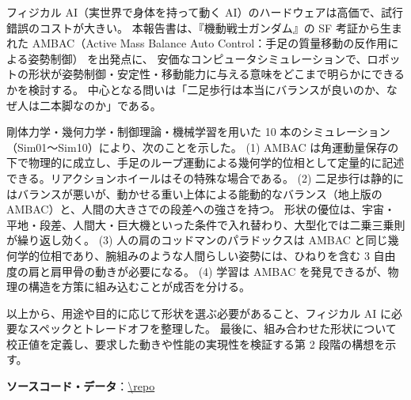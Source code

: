 フィジカル AI（実世界で身体を持って動く AI）のハードウェアは高価で、試行錯誤のコストが大きい。
本報告書は、『機動戦士ガンダム』の SF 考証から生まれた AMBAC（Active Mass Balance Auto Control：手足の質量移動の反作用による姿勢制御）\cite{R1,R42} を出発点に、
安価なコンピュータシミュレーションで、ロボットの形状が姿勢制御・安定性・移動能力に与える意味をどこまで明らかにできるかを検討する。
中心となる問いは「二足歩行は本当にバランスが良いのか、なぜ人は二本脚なのか」である。

剛体力学・幾何力学・制御理論・機械学習を用いた 10 本のシミュレーション（Sim01〜Sim10）により、次のことを示した。
(1) AMBAC は角運動量保存の下で物理的に成立し、手足のループ運動による幾何学的位相として定量的に記述できる。リアクションホイールはその特殊な場合である。
(2) 二足歩行は静的にはバランスが悪いが、動かせる重い上体による能動的なバランス（地上版の AMBAC）と、人間の大きさでの段差への強さを持つ。
形状の優位は、宇宙・平地・段差、人間大・巨大機といった条件で入れ替わり、大型化では二乗三乗則が繰り返し効く。
(3) 人の肩のコッドマンのパラドックスは AMBAC と同じ幾何学的位相であり、腕組みのような人間らしい姿勢には、ひねりを含む 3 自由度の肩と肩甲骨の動きが必要になる。
(4) 学習は AMBAC を発見できるが、物理の構造を方策に組み込むことが成否を分ける。

以上から、用途や目的に応じて形状を選ぶ必要があること、フィジカル AI に必要なスペックとトレードオフを整理した。
最後に、組み合わせた形状について校正値を定義し、要求した動きや性能の実現性を検証する第 2 段階の構想を示す。

\medskip\noindent
\textbf{ソースコード・データ}：\url{\repo}
